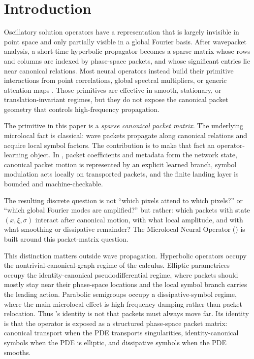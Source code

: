 \section{Introduction}
\label{sec:intro}

Oscillatory solution operators have a representation that is largely invisible in point space and only partially visible in a global Fourier basis.  After wavepacket analysis, a short-time hyperbolic propagator becomes a sparse matrix whose rows and columns are indexed by phase-space packets, and whose significant entries lie near canonical relations.  Most neural operators instead build their primitive interactions from point correlations, global spectral multipliers, or generic attention maps \citep{kovachki2023neuraloperator,li2021fno,lu2021deeponet}.  Those primitives are effective in smooth, stationary, or translation-invariant regimes, but they do not expose the canonical packet geometry that controls high-frequency propagation.

The primitive in this paper is a \emph{sparse canonical packet matrix}.  The underlying microlocal fact is classical: wave packets propagate along canonical relations and acquire local symbol factors.  The contribution is to make that fact an operator-learning object.  In \MiNO, packet coefficients and metadata form the network state, canonical packet motion is represented by an explicit learned branch, symbol modulation acts locally on transported packets, and the finite landing layer is bounded and machine-checkable.

The resulting discrete question is not ``which pixels attend to which pixels?'' or ``which global Fourier modes are amplified?'' but rather: which packets with state $(x,\xi,\sigma)$ interact after canonical motion, with what local amplitude, and with what smoothing or dissipative remainder?  The Microlocal Neural Operator (\MiNO) is built around this packet-matrix question.

This distinction matters outside wave propagation.  Hyperbolic operators occupy the nontrivial-canonical-graph regime of the calculus.  Elliptic parametrices occupy the identity-canonical pseudodifferential regime, where packets should mostly stay near their phase-space locations and the local symbol branch carries the leading action.  Parabolic semigroups occupy a dissipative-symbol regime, where the main microlocal effect is high-frequency damping rather than packet relocation.  Thus \MiNO's identity is not that packets must always move far.  Its identity is that the operator is exposed as a structured phase-space packet matrix: canonical transport when the PDE transports singularities, identity-canonical symbols when the PDE is elliptic, and dissipative symbols when the PDE smooths.

